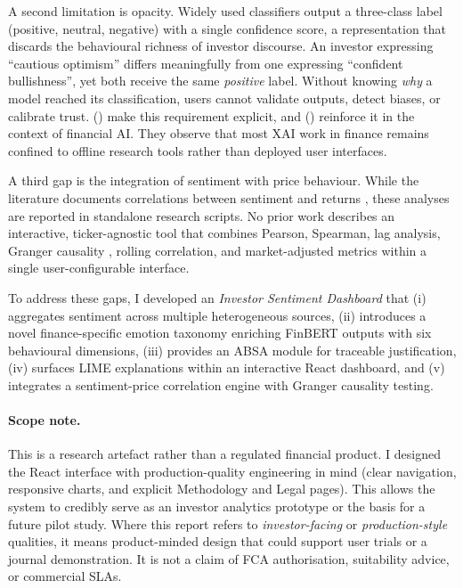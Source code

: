 A second limitation is opacity. Widely used classifiers output a three-class
label (positive, neutral, negative) with a single confidence score, a
representation that discards the behavioural richness of investor discourse.
An investor expressing ``cautious optimism'' differs meaningfully from one
expressing ``confident bullishness'', yet both receive the same
\textit{positive} label. Without knowing \textit{why} a model reached its
classification, users cannot validate outputs, detect biases, or calibrate
trust. \citeauthor{doshivelez2017interpretable}
(\citeyear{doshivelez2017interpretable}) make this requirement explicit, and
\citeauthor{yeo2023xai} (\citeyear{yeo2023xai}) reinforce it in the context
of financial AI. They observe that most XAI work in finance remains confined
to offline research tools rather than deployed user interfaces.

A third gap is the integration of sentiment with price behaviour. While the
literature documents correlations between sentiment and returns
\citep{bollen2011twitter, schumaker2009textmining}, these analyses are
reported in standalone research scripts. No prior work describes an
interactive, ticker-agnostic tool that combines Pearson, Spearman, lag
analysis, Granger causality \citep{granger1969}, rolling correlation, and
market-adjusted metrics within a single user-configurable interface.

To address these gaps, I developed an \textit{Investor Sentiment Dashboard} that
(i) aggregates sentiment across multiple heterogeneous sources, (ii) introduces a
novel finance-specific emotion taxonomy enriching FinBERT outputs with six
behavioural dimensions, (iii) provides an ABSA module for traceable justification,
(iv) surfaces LIME explanations within an interactive React dashboard, and (v)
integrates a sentiment-price correlation engine with Granger causality testing.

\paragraph{Scope note.}
This is a research artefact rather than a regulated financial product. I designed the React interface with production-quality engineering in mind (clear navigation, responsive charts, and explicit Methodology and Legal pages). This allows the system to credibly serve as an investor analytics prototype or the basis for a future pilot study. Where this report refers to \emph{investor-facing} or \emph{production-style} qualities, it means product-minded design that could support user trials or a journal demonstration. It is not a claim of FCA authorisation, suitability advice, or commercial SLAs.

